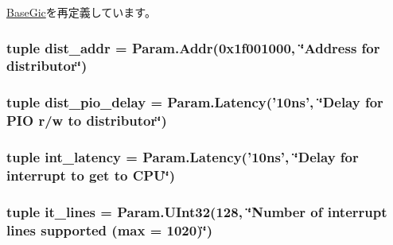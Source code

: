 \hyperlink{classGic_1_1BaseGic_a17da7064bc5c518791f0c891eff05fda}{BaseGic}を再定義しています。\hypertarget{classGic_1_1Pl390_af62011e9ced3e54b71776393aa76b720}{
\subsubsection[{dist\_\-addr}]{\setlength{\rightskip}{0pt plus 5cm}tuple {\bf dist\_\-addr} = {\bf Param.Addr}(0x1f001000, \char`\"{}Address for distributor\char`\"{})}}
\label{classGic_1_1Pl390_af62011e9ced3e54b71776393aa76b720}
\hypertarget{classGic_1_1Pl390_a7c1607658f61f4070dc09abab68d0c5d}{
\subsubsection[{dist\_\-pio\_\-delay}]{\setlength{\rightskip}{0pt plus 5cm}tuple {\bf dist\_\-pio\_\-delay} = Param.Latency('10ns', \char`\"{}Delay for PIO r/w to distributor\char`\"{})}}
\label{classGic_1_1Pl390_a7c1607658f61f4070dc09abab68d0c5d}
\hypertarget{classGic_1_1Pl390_a4843e32273ec8c1b9da3ce36ac4cd439}{
\subsubsection[{int\_\-latency}]{\setlength{\rightskip}{0pt plus 5cm}tuple {\bf int\_\-latency} = Param.Latency('10ns', \char`\"{}Delay for interrupt to get to CPU\char`\"{})}}
\label{classGic_1_1Pl390_a4843e32273ec8c1b9da3ce36ac4cd439}
\hypertarget{classGic_1_1Pl390_a139571be293d7ff174585fe7f804ef93}{
\subsubsection[{it\_\-lines}]{\setlength{\rightskip}{0pt plus 5cm}tuple {\bf it\_\-lines} = Param.UInt32(128, \char`\"{}Number of interrupt lines supported (max = 1020)\char`\"{})}}
